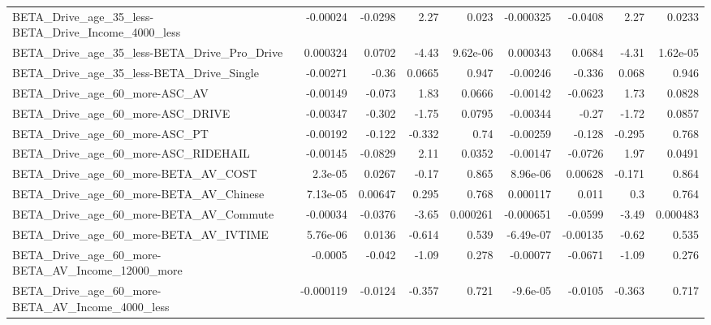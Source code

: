 \begin{tabular}{lrrrrrrrr}
BETA\_Drive\_age\_35\_less-BETA\_Drive\_Income\_4000\_less &    -0.00024 &      -0.0298 &      2.27 &    0.023 &  -0.000325 &     -0.0408 &         2.27 &        0.0233 \\
BETA\_Drive\_age\_35\_less-BETA\_Drive\_Pro\_Drive        &    0.000324 &       0.0702 &     -4.43 & 9.62e-06 &   0.000343 &      0.0684 &        -4.31 &      1.62e-05 \\
BETA\_Drive\_age\_35\_less-BETA\_Drive\_Single           &    -0.00271 &        -0.36 &    0.0665 &    0.947 &   -0.00246 &      -0.336 &        0.068 &         0.946 \\
BETA\_Drive\_age\_60\_more-ASC\_AV                      &    -0.00149 &       -0.073 &      1.83 &   0.0666 &   -0.00142 &     -0.0623 &         1.73 &        0.0828 \\
BETA\_Drive\_age\_60\_more-ASC\_DRIVE                   &    -0.00347 &       -0.302 &     -1.75 &   0.0795 &   -0.00344 &       -0.27 &        -1.72 &        0.0857 \\
BETA\_Drive\_age\_60\_more-ASC\_PT                      &    -0.00192 &       -0.122 &    -0.332 &     0.74 &   -0.00259 &      -0.128 &       -0.295 &         0.768 \\
BETA\_Drive\_age\_60\_more-ASC\_RIDEHAIL                &    -0.00145 &      -0.0829 &      2.11 &   0.0352 &   -0.00147 &     -0.0726 &         1.97 &        0.0491 \\
BETA\_Drive\_age\_60\_more-BETA\_AV\_COST                &     2.3e-05 &       0.0267 &     -0.17 &    0.865 &   8.96e-06 &     0.00628 &       -0.171 &         0.864 \\
BETA\_Drive\_age\_60\_more-BETA\_AV\_Chinese             &    7.13e-05 &      0.00647 &     0.295 &    0.768 &   0.000117 &       0.011 &          0.3 &         0.764 \\
BETA\_Drive\_age\_60\_more-BETA\_AV\_Commute             &    -0.00034 &      -0.0376 &     -3.65 & 0.000261 &  -0.000651 &     -0.0599 &        -3.49 &      0.000483 \\
BETA\_Drive\_age\_60\_more-BETA\_AV\_IVTIME              &    5.76e-06 &       0.0136 &    -0.614 &    0.539 &  -6.49e-07 &    -0.00135 &        -0.62 &         0.535 \\
BETA\_Drive\_age\_60\_more-BETA\_AV\_Income\_12000\_more   &     -0.0005 &       -0.042 &     -1.09 &    0.278 &   -0.00077 &     -0.0671 &        -1.09 &         0.276 \\
BETA\_Drive\_age\_60\_more-BETA\_AV\_Income\_4000\_less    &   -0.000119 &      -0.0124 &    -0.357 &    0.721 &   -9.6e-05 &     -0.0105 &       -0.363 &         0.717 \\

\end{tabular}
